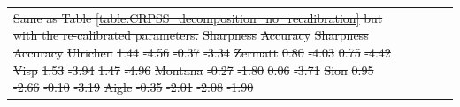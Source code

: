 \documentclass[hess, manuscript]{copernicus}
\providecommand{\DIFdel}[1]{{\protect\color{red}\sout{#1}}}                      %
\providecommand{\DIFdelFL}[1]{\DIFdel{#1}} %
\begin{document}
\begin{table}[htb]
\begin{center}
\begin{tabular}{l c c c c}
{%
\DIFdelFL{Same as Table \ref{table:CRPSS_decomposition_no_recalibration} but with the re-calibrated parameters.}}
\DIFdelFL{Sharpness }%
\DIFdelFL{Accuracy }%
\DIFdelFL{Sharpness }%
\DIFdelFL{Accuracy }%
\DIFdelFL{Ulrichen }%
\DIFdelFL{1.44 }%
\DIFdelFL{-4.56 }%
\DIFdelFL{-0.37 }%
\DIFdelFL{-3.34 }%
\DIFdelFL{Zermatt }%
\DIFdelFL{0.80 }%
\DIFdelFL{-4.03 }%
\DIFdelFL{0.75 }%
\DIFdelFL{-4.42 }%
\DIFdelFL{Visp }%
\DIFdelFL{1.53 }%
\DIFdelFL{-3.94 }%
\DIFdelFL{1.47 }%
\DIFdelFL{-4.96 }%
\DIFdelFL{Montana }%
\DIFdelFL{-0.27 }%
\DIFdelFL{-1.80 }%
\DIFdelFL{0.06 }%
\DIFdelFL{-3.71 }%
\DIFdelFL{Sion }%
\DIFdelFL{0.95 }%
\DIFdelFL{-2.66 }%
\DIFdelFL{-0.10 }%
\DIFdelFL{-3.19 }%
\DIFdelFL{Aigle }%
\DIFdelFL{-0.35 }%
\DIFdelFL{-2.01 }%
\DIFdelFL{-2.08 }%
\DIFdelFL{-1.90 }%


\end{tabular}
\end{center}
\end{table}
\end{document}
